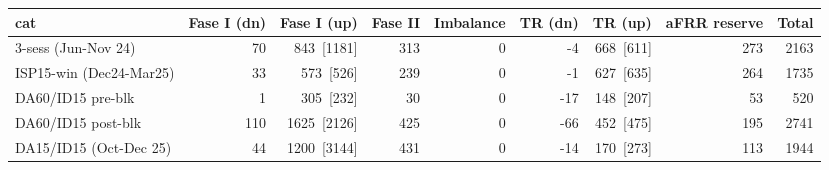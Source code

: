 \begin{tabular}{lrrrrrrrr}
\toprule
cat & Fase I (dn) & Fase I (up) & Fase II & Imbalance & TR (dn) & TR (up) & aFRR reserve & Total \\
\midrule
3-sess (Jun-Nov 24) & 70 & 843~{\color{seasoncol}\scriptsize[1181]} & 313 & 0 & -4 & 668~{\color{seasoncol}\scriptsize[611]} & 273 & 2163 \\
ISP15-win (Dec24-Mar25) & 33 & 573~{\color{seasoncol}\scriptsize[526]} & 239 & 0 & -1 & 627~{\color{seasoncol}\scriptsize[635]} & 264 & 1735 \\
DA60/ID15 pre-blk & 1 & 305~{\color{seasoncol}\scriptsize[232]} & 30 & 0 & -17 & 148~{\color{seasoncol}\scriptsize[207]} & 53 & 520 \\
DA60/ID15 post-blk & 110 & 1625~{\color{seasoncol}\scriptsize[2126]} & 425 & 0 & -66 & 452~{\color{seasoncol}\scriptsize[475]} & 195 & 2741 \\
DA15/ID15 (Oct-Dec 25) & 44 & 1200~{\color{seasoncol}\scriptsize[3144]} & 431 & 0 & -14 & 170~{\color{seasoncol}\scriptsize[273]} & 113 & 1944 \\
\bottomrule
\end{tabular}
